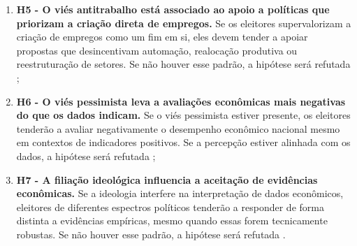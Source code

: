 \begin{enumerate}[label=\alph*)]
    \item \textbf{H5 - O viés antitrabalho está associado ao apoio a políticas que priorizam a criação direta de empregos.}  
    Se os eleitores supervalorizam a criação de empregos como um fim em si, eles devem tender a apoiar propostas que desincentivam automação, realocação produtiva ou reestruturação de setores. Se não houver esse padrão, a hipótese será refutada \cite{The_Myth_of_the_Rational_Voter, landsburg2012armchair};

    \item \textbf{H6 - O viés pessimista leva a avaliações econômicas mais negativas do que os dados indicam.}  
    Se o viés pessimista estiver presente, os eleitores tenderão a avaliar negativamente o desempenho econômico nacional mesmo em contextos de indicadores positivos. Se a percepção estiver alinhada com os dados, a hipótese será refutada \cite{The_Myth_of_the_Rational_Voter, easterbrook2004progress};

    \item \textbf{H7 - A filiação ideológica influencia a aceitação de evidências econômicas.}  
    Se a ideologia interfere na interpretação de dados econômicos, eleitores de diferentes espectros políticos tenderão a responder de forma distinta a evidências empíricas, mesmo quando essas forem tecnicamente robustas. Se não houver esse padrão, a hipótese será refutada \cite{The_Myth_of_the_Rational_Voter, kahan2012polarization}.


\end{enumerate}


